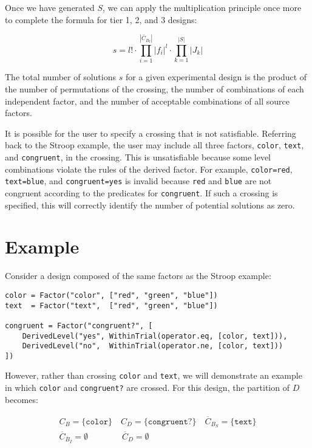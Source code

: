 Once we have generated $S$, we can apply the multiplication principle once more to complete the formula for tier 1, 2, and 3 designs:

\[
s = l! \cdot \prod_{i=1}^{|\overline{C}_{B_I}|} |f_i|^l \cdot \prod_{k=1}^{|S|} |J_k|
\]

The total number of solutions $s$ for a given experimental design is the product of the number of permutations of the crossing, the number of combinations of each independent factor, and the number of acceptable combinations of all source factors.

It is possible for the user to specify a crossing that is not satisfiable. Referring back to the Stroop example, the user may include all three factors, \texttt{color}, \texttt{text}, and \texttt{congruent}, in the crossing. This is unsatisfiable because some level combinations violate the rules of the derived factor. For example, \texttt{color=red}, \texttt{text=blue}, and \texttt{congruent=yes} is invalid because \texttt{red} and \texttt{blue} are not congruent according to the predicates for \texttt{congruent}. If such a crossing is specified, this will correctly identify the number of potential solutions as zero.

\section{Example}

Consider a design composed of the same factors as the Stroop example:

\begin{verbatim}
color = Factor("color", ["red", "green", "blue"])
text  = Factor("text",  ["red", "green", "blue"])

congruent = Factor("congruent?", [
    DerivedLevel("yes", WithinTrial(operator.eq, [color, text])),
    DerivedLevel("no",  WithinTrial(operator.ne, [color, text]))
])
\end{verbatim}

However, rather than crossing \texttt{color} and \texttt{text}, we will demonstrate an example in which \texttt{color} and \texttt{congruent?} are crossed. For this design, the partition of $D$ becomes:

\begin{gather*}
    C_B = \{\texttt{color}\} \quad C_D = \{\texttt{congruent?}\}  \quad  \overline{C}_{B_S} = \{\texttt{text}\} \\
    \overline{C}_{B_I} = \emptyset \qquad\qquad \overline{C}_D = \emptyset
\end{gather*}

